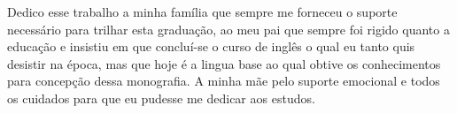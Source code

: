 Dedico esse trabalho a minha família que sempre me forneceu o suporte
necessário para trilhar esta graduação, ao meu pai que sempre foi rigido quanto
a educação e insistiu em que concluí-se o curso de inglês o qual eu tanto quis
desistir na época, mas que hoje é a lingua base ao qual obtive os conhecimentos
para concepção dessa monografia. A minha mãe pelo suporte emocional e todos os
cuidados para que eu pudesse me dedicar aos estudos.

